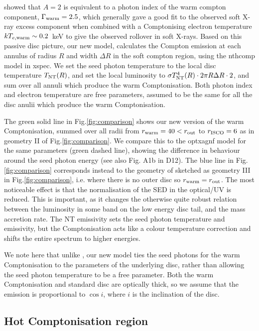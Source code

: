 \documentclass[a4paper,fleqn,usenatbib]{mnras}
\begin{document}
\cite{petrucci2017} showed that $A=2$ is equivalent to a photon index
of the warm compton component, $\Gamma_{\rm warm}=2.5$, which generally gave
a good fit to the observed soft X-ray excess component when combined
with a  Comptonising electron temperature
$kT_{e,{\rm warm}}\sim 0.2$~keV to give the observed 
rollover in soft X-rays.
Based on this passive disc picture, our new model, 
calculates the Compton emission at each annulus of radius $R$ and
width $\Delta R$
in the soft compton region, using the {\sc nthcomp} model \citep{zdziarski1996,zycki1999} in {\sc xspec}.
We set the seed photon temperature to the local disc temperature
$T_{\rm NT}(R)$, and set the local
luminosity to $\sigma T^4 _{\rm NT}(R)\cdot 2\pi R\Delta R\cdot 2$, and sum
over all annuli which produce the warm Comptonisation. 
Both photon index and electron temperature are free parameters, assumed to be the same for all the disc anulii which produce the warm Comptonisation.

The green solid line in Fig.\ref{fig:comparison} shows our new version
of the warm Comptonisation, summed over all radii from
$r_{\rm warm}=40 <r_{\rm out}$ to $r_{\rm ISCO}=6$ as in geometry II of
Fig.\ref{fig:comparison}.  We compare this to the  {\sc optxagnf} model
for the same parameters (green dashed line), showing the difference in
behaviour around the seed photon energy (see also Fig. A1b in D12).
%
The blue line in Fig.\ref{fig:comparison} corresponds instead to the
geometry of \cite{petrucci2017} sketched as geometry III in
Fig.\ref{fig:comparison}, i.e. where there is no outer disc so $r_{\rm
  warm}=r_{\rm out}$. The most noticeable effect is that the
normalisation of the SED in the optical/UV is 
reduced. This is important, as it changes the
otherwise quite robust relation between the luminosity in some band on
the low energy disc tail, and the mass accretion rate. The NT
emissivity sets the seed photon temperature and emissivity, but the
Comptonisation acts like a colour temperature correction and shifts
the entire spectrum to higher energies. 

We note here that unlike
\cite{petrucci2017}, our new model ties the seed photons for the warm
Comptonisation to the parameters of the underlying disc,
rather than allowing the seed photon temperature to be a free
parameter. 
Both the warm Comptonisation and standard disc are optically thick, so
we assume that the emission is  proportional to $\cos i$, where $i$ is the
inclination of the disc. 

\subsection{Hot Comptonisation region}
\label{sec:pl}
\end{document}
